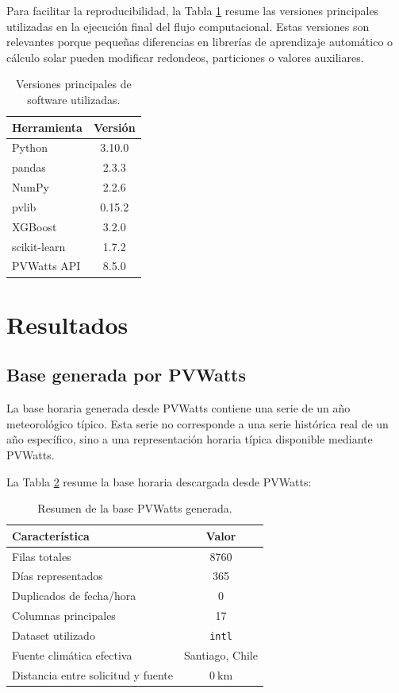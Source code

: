 \documentclass[12pt, letterpaper]{article}
\begin{document}
Para facilitar la reproducibilidad, la Tabla \ref{tab:versiones_software} resume las versiones principales utilizadas en la ejecuci\'on final del flujo computacional. Estas versiones son relevantes porque peque\~nas diferencias en librer\'ias de aprendizaje autom\'atico o c\'alculo solar pueden modificar redondeos, particiones o valores auxiliares.

\begin{table}[H]
\centering
\caption{Versiones principales de software utilizadas.}
\label{tab:versiones_software}
\begin{tabular}{lc}
\toprule
\textbf{Herramienta} & \textbf{Versi\'on} \\
\midrule
Python & 3.10.0 \\
pandas & 2.3.3 \\
NumPy & 2.2.6 \\
pvlib & 0.15.2 \\
XGBoost & 3.2.0 \\
scikit-learn & 1.7.2 \\
PVWatts API & 8.5.0 \\
\bottomrule
\end{tabular}
\end{table}


\section{Resultados}

\subsection{Base generada por PVWatts}

La base horaria generada desde PVWatts contiene una serie de un a\~no meteorol\'ogico t\'ipico. Esta serie no corresponde a una serie hist\'orica real de un a\~no espec\'ifico, sino a una representaci\'on horaria t\'ipica disponible mediante PVWatts.

La Tabla \ref{tab:base_pvwatts} resume la base horaria descargada desde PVWatts:

\begin{table}[H]
\centering
\caption{Resumen de la base PVWatts generada.}
\label{tab:base_pvwatts}
\begin{tabular}{lc}
\toprule
\textbf{Caracter\'istica} & \textbf{Valor} \\
\midrule
Filas totales & 8760 \\
D\'ias representados & 365 \\
Duplicados de fecha/hora & 0 \\
Columnas principales & 17 \\
Dataset utilizado & \texttt{intl} \\
Fuente clim\'atica efectiva & Santiago, Chile \\
Distancia entre solicitud y fuente & \(\SI{0}{\kilo\meter}\) \\
\bottomrule
\end{tabular}
\end{table}
\end{document}
